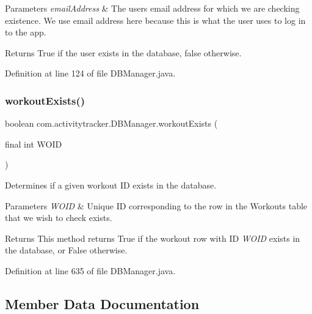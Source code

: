 \begin{DoxyParams}{Parameters}
{\em email\+Address} & The user\textquotesingle{}s email address for which we are checking existence. We use email address here because this is what the user uses to log in to the app. \\
\hline
\end{DoxyParams}
\begin{DoxyReturn}{Returns}
True if the user exists in the database, false otherwise. 
\end{DoxyReturn}


Definition at line 124 of file D\+B\+Manager.\+java.

\mbox{\label{classcom_1_1activitytracker_1_1_d_b_manager_a1ddc4af4997ccf31c023658fa7face2d}} 
\subsubsection{\texorpdfstring{workout\+Exists()}{workoutExists()}}
{\footnotesize\ttfamily boolean com.\+activitytracker.\+D\+B\+Manager.\+workout\+Exists (\begin{DoxyParamCaption}\item[{final int}]{W\+O\+ID }\end{DoxyParamCaption})}

Determines if a given workout ID exists in the database.


\begin{DoxyParams}{Parameters}
{\em W\+O\+ID} & Unique ID corresponding to the row in the Workouts table that we wish to check exists.\\
\hline
\end{DoxyParams}
\begin{DoxyReturn}{Returns}
This method returns True if the workout row with ID {\itshape W\+O\+ID} exists in the database, or False otherwise. 
\end{DoxyReturn}


Definition at line 635 of file D\+B\+Manager.\+java.



\subsection{Member Data Documentation}
\mbox{\label{classcom_1_1activitytracker_1_1_d_b_manager_a064088d13ac09eb147fdc19268771521}} 

